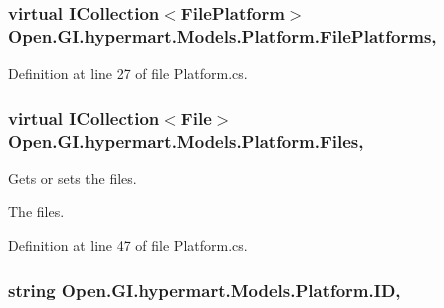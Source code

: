 \subsubsection[{File\+Platforms}]{\setlength{\rightskip}{0pt plus 5cm}virtual I\+Collection$<${\bf File\+Platform}$>$ Open.\+G\+I.\+hypermart.\+Models.\+Platform.\+File\+Platforms\hspace{0.3cm}{\ttfamily [get]}, {\ttfamily [set]}}\label{class_open_1_1_g_i_1_1hypermart_1_1_models_1_1_platform_ac358f8b1b556f6d99fb47fdb29de7202}


Definition at line 27 of file Platform.\+cs.

\hypertarget{class_open_1_1_g_i_1_1hypermart_1_1_models_1_1_platform_a984a31b30ada1f33acef9099c09d9ca0}{}
\subsubsection[{Files}]{\setlength{\rightskip}{0pt plus 5cm}virtual I\+Collection$<${\bf File}$>$ Open.\+G\+I.\+hypermart.\+Models.\+Platform.\+Files\hspace{0.3cm}{\ttfamily [get]}, {\ttfamily [set]}}\label{class_open_1_1_g_i_1_1hypermart_1_1_models_1_1_platform_a984a31b30ada1f33acef9099c09d9ca0}


Gets or sets the files. 

The files. 

Definition at line 47 of file Platform.\+cs.

\hypertarget{class_open_1_1_g_i_1_1hypermart_1_1_models_1_1_platform_ae11ad27de467131d539e35f598ff3051}{}
\subsubsection[{I\+D}]{\setlength{\rightskip}{0pt plus 5cm}string Open.\+G\+I.\+hypermart.\+Models.\+Platform.\+I\+D\hspace{0.3cm}{\ttfamily [get]}, {\ttfamily [set]}}\label{class_open_1_1_g_i_1_1hypermart_1_1_models_1_1_platform_ae11ad27de467131d539e35f598ff3051}


